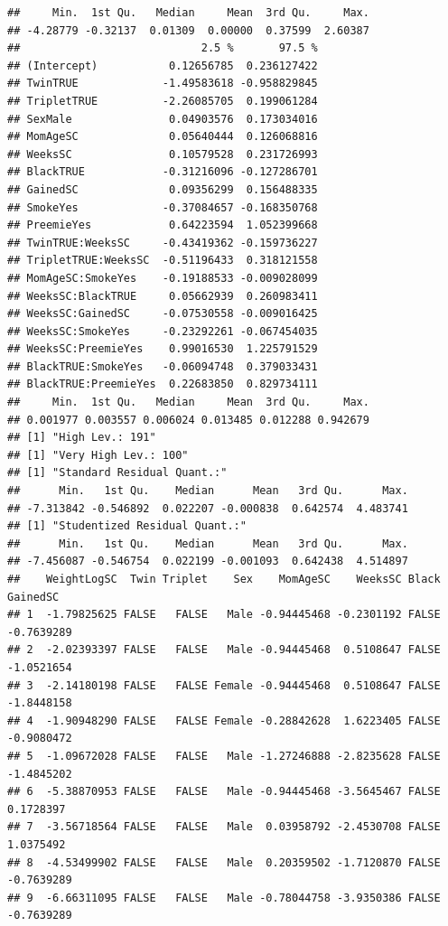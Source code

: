 \documentclass{article}\usepackage[]{graphicx}\usepackage[]{xcolor}
\makeatletter
\newenvironment{kframe}{%
 \def\at@end@of@kframe{}%
 \ifinner\ifhmode%
  \def\at@end@of@kframe{\end{minipage}}%
  \begin{minipage}{\columnwidth}%
 \fi\fi%
 \def\FrameCommand##1{\hskip\@totalleftmargin \hskip-\fboxsep
 \colorbox{shadecolor}{##1}\hskip-\fboxsep
     \hskip-\linewidth \hskip-\@totalleftmargin \hskip\columnwidth}%
 \MakeFramed {\advance\hsize-\width
   \@totalleftmargin\z@ \linewidth\hsize
   \@setminipage}}%
 {\par\unskip\endMakeFramed%
 \at@end@of@kframe}
\newenvironment{knitrout}{}{} %
\makeatother
\begin{document}
\begin{enumerate}[a.]
\begin{knitrout}
\begin{kframe}
{\ttfamily\noindent\itshape\color{messagecolor}{\#\# there are higher-order terms (interactions) in this model\\\#\# consider setting type = 'predictor'; see ?vif}}\begin{verbatim}
##     Min.  1st Qu.   Median     Mean  3rd Qu.     Max. 
## -4.28779 -0.32137  0.01309  0.00000  0.37599  2.60387 
##                            2.5 %       97.5 %
## (Intercept)           0.12656785  0.236127422
## TwinTRUE             -1.49583618 -0.958829845
## TripletTRUE          -2.26085705  0.199061284
## SexMale               0.04903576  0.173034016
## MomAgeSC              0.05640444  0.126068816
## WeeksSC               0.10579528  0.231726993
## BlackTRUE            -0.31216096 -0.127286701
## GainedSC              0.09356299  0.156488335
## SmokeYes             -0.37084657 -0.168350768
## PreemieYes            0.64223594  1.052399668
## TwinTRUE:WeeksSC     -0.43419362 -0.159736227
## TripletTRUE:WeeksSC  -0.51196433  0.318121558
## MomAgeSC:SmokeYes    -0.19188533 -0.009028099
## WeeksSC:BlackTRUE     0.05662939  0.260983411
## WeeksSC:GainedSC     -0.07530558 -0.009016425
## WeeksSC:SmokeYes     -0.23292261 -0.067454035
## WeeksSC:PreemieYes    0.99016530  1.225791529
## BlackTRUE:SmokeYes   -0.06094748  0.379033431
## BlackTRUE:PreemieYes  0.22683850  0.829734111
##     Min.  1st Qu.   Median     Mean  3rd Qu.     Max. 
## 0.001977 0.003557 0.006024 0.013485 0.012288 0.942679 
## [1] "High Lev.: 191"
## [1] "Very High Lev.: 100"
## [1] "Standard Residual Quant.:"
##      Min.   1st Qu.    Median      Mean   3rd Qu.      Max. 
## -7.313842 -0.546892  0.022207 -0.000838  0.642574  4.483741 
## [1] "Studentized Residual Quant.:"
##      Min.   1st Qu.    Median      Mean   3rd Qu.      Max. 
## -7.456087 -0.546754  0.022199 -0.001093  0.642438  4.514897 
##    WeightLogSC  Twin Triplet    Sex    MomAgeSC    WeeksSC Black   GainedSC
## 1  -1.79825625 FALSE   FALSE   Male -0.94445468 -0.2301192 FALSE -0.7639289
## 2  -2.02393397 FALSE   FALSE   Male -0.94445468  0.5108647 FALSE -1.0521654
## 3  -2.14180198 FALSE   FALSE Female -0.94445468  0.5108647 FALSE -1.8448158
## 4  -1.90948290 FALSE   FALSE Female -0.28842628  1.6223405 FALSE -0.9080472
## 5  -1.09672028 FALSE   FALSE   Male -1.27246888 -2.8235628 FALSE -1.4845202
## 6  -5.38870953 FALSE   FALSE   Male -0.94445468 -3.5645467 FALSE  0.1728397
## 7  -3.56718564 FALSE   FALSE   Male  0.03958792 -2.4530708 FALSE  1.0375492
## 8  -4.53499902 FALSE   FALSE   Male  0.20359502 -1.7120870 FALSE -0.7639289
## 9  -6.66311095 FALSE   FALSE   Male -0.78044758 -3.9350386 FALSE -0.7639289

\end{verbatim}
\end{kframe}
\end{knitrout}
\end{enumerate}
\end{document}
